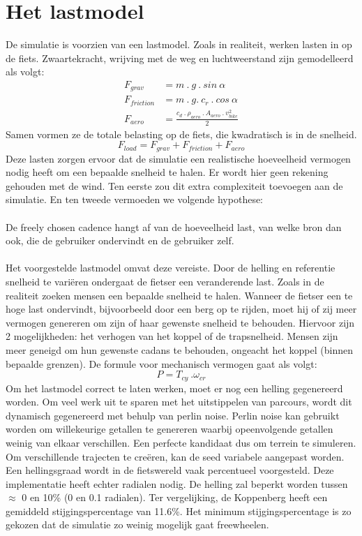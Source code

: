 \section{Het lastmodel}
De simulatie is voorzien van een lastmodel. Zoals in realiteit, werken lasten in op de fiets. Zwaartekracht, wrijving met de weg en luchtweerstand zijn gemodelleerd als volgt:
\\
\begin{align*}
F_{grav}&=m \ . \ g \ . \ sin \ \alpha \\
F_{friction}&=m \ . \ g. \ c_r \ . \ cos \ \alpha \\
F_{aero}&=\frac{c_d \ . \ \rho_{aero} \ . \ A_{aero} \ . \ v_{bike}^2}{2}
\end{align*}
Samen vormen ze de totale belasting op de fiets, die kwadratisch is in de snelheid.
\[F_{load} = F_{grav}+F_{friction}+F_{aero}\]
Deze lasten zorgen ervoor dat de simulatie een realistische hoeveelheid vermogen nodig heeft om een bepaalde snelheid te halen. Er wordt hier geen rekening gehouden met de wind. Ten eerste zou dit extra complexiteit toevoegen aan de simulatie. En ten tweede vermoeden we volgende hypothese:
\\\\
\tab De freely chosen cadence hangt af van de hoeveelheid last, van welke bron dan \tab ook, die de gebruiker ondervindt en de gebruiker zelf.
\\\\
Het voorgestelde lastmodel omvat deze vereiste. Door de helling en referentie snelheid te variëren ondergaat de fietser een veranderende last. Zoals in de realiteit zoeken mensen een bepaalde snelheid te halen. Wanneer de fietser een te hoge last ondervindt, bijvoorbeeld door een berg op te rijden, moet hij of zij meer vermogen genereren om zijn of haar gewenste snelheid te behouden. Hiervoor zijn 2 mogelijkheden: het verhogen van het koppel of de trapsnelheid. Mensen zijn meer geneigd om hun gewenste cadans te behouden, ongeacht het koppel (binnen bepaalde grenzen). De formule voor mechanisch vermogen gaat als volgt:
\[P=T_{cy} \ . \omega_{cr} \]
Om het lastmodel correct te laten werken, moet er nog een helling gegenereerd worden. Om veel werk uit te sparen met het uitstippelen van parcours, wordt dit dynamisch gegenereerd met behulp van perlin noise. Perlin noise kan gebruikt worden om willekeurige getallen te genereren waarbij opeenvolgende getallen weinig van elkaar verschillen. Een perfecte kandidaat dus om terrein te simuleren. Om verschillende trajecten te creëren, kan de seed variabele aangepast worden. Een hellingsgraad wordt in de fietswereld vaak percentueel voorgesteld. Deze implementatie heeft echter radialen nodig. De helling zal beperkt worden tussen $\approx$ 0 en 10\% (0 en 0.1 radialen). Ter vergelijking, de Koppenberg heeft een gemiddeld stijgingspercentage van 11.6\%. Het minimum stijgingspercentage is zo gekozen dat de simulatie zo weinig mogelijk gaat freewheelen.
